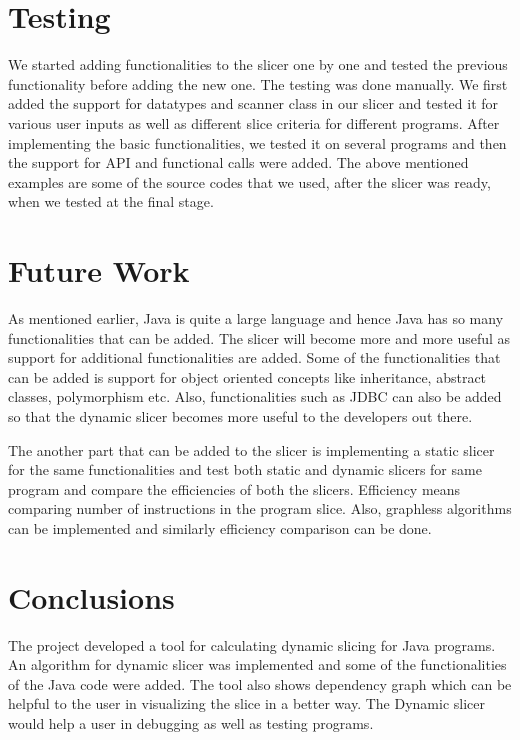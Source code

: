 \documentclass[conference]{IEEEtran}
\begin{document}
\section{Testing}
We started adding functionalities to the slicer one by one and tested the previous functionality before adding the new one. The testing was done manually. We first added the support for datatypes and scanner class in our slicer and tested it for various user inputs as well as different slice criteria for different programs. After implementing the basic functionalities, we tested it on several programs and then the support for API and functional calls were added. The above mentioned examples are some of the source codes that we used, after the slicer was ready, when we tested at the final stage. 
\section{Future Work}
As mentioned earlier, Java is quite a large language and hence Java has so many functionalities that can be added. The slicer will become more and more useful as support for additional functionalities are added. Some of the functionalities that can be added is support for object oriented concepts like inheritance, abstract classes, polymorphism etc. Also, functionalities such as JDBC can also be added so that the dynamic slicer becomes more useful to the developers out there.

The another part that can be added to the slicer is implementing a static slicer for the same functionalities and test both static and dynamic slicers for same program and compare the efficiencies of both the slicers. Efficiency means comparing number of instructions in the program slice. Also, graphless algorithms can be implemented and similarly efficiency comparison can be done. 
\section{Conclusions}
The project developed a tool for calculating dynamic slicing for Java programs. An algorithm for dynamic slicer was implemented and some of the functionalities of the Java code were added. The tool also shows dependency graph which can be helpful to the user in visualizing the slice in a better way. The Dynamic slicer would help a user in debugging as well as testing programs.    
\end{document}
